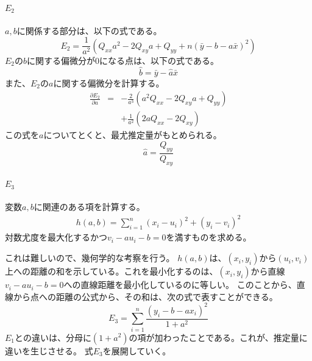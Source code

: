 \paragraph{$E_2$}
$a,b$に関係する部分は、以下の式である。
\begin{equation*}
 E_2 = \frac{1}{a^2}(Q_{xx}a^2-2Q_{xy}a+Q_{yy}+n(\bar{y}-b-a\bar{x})^2)
\end{equation*}
$E_2$の$b$に関する偏微分が$0$になる点は、以下の式である。
\begin{equation*}
 \hat{b} = \bar{y}-\hat{a}\bar{x}
\end{equation*}
また、$E_2$の$a$に関する偏微分を計算する。
\begin{eqnarray*}
 \frac{\partial E_2}{\partial a} &=& -\frac{2}{a^3}(a^2Q_{xx}-2Q_{xy}a+Q_{yy}) \\
& & +\frac{1}{a^2}(2aQ_{xx}-2Q_{xy})
\end{eqnarray*}
この式を$a$についてとくと、最尤推定量がもとめられる。
\begin{equation*}
 \hat{a}= \frac{Q_{yy}}{Q_{xy}}
\end{equation*}

\paragraph{$E_3$}

変数$a,b$に関連のある項を計算する。
\begin{eqnarray*}
 h(a,b) = \sum_{i=1}^n (x_i-u_i)^2+(y_i-v_i)^2
\end{eqnarray*}
対数尤度を最大化するかつ$v_i -a u_i -b = 0$を満すものを求める。

これは難しいので、幾何学的な考察を行う。
$h(a,b)$は、$(x_i,y_i)$から$(u_i,v_i)$上への距離の和を示している。これを最小化するのは、$(x_i,y_i)$から直線$v_i-a u_i-b=0$への直線距離を最小化しているのに等しい。
このことから、直線から点への距離の公式から、その和は、次の式で表すことができる。
\begin{equation*}
 E_3 = \sum_{i=1}^n \frac{ (y_i-b-ax_i)^2}{1+a^2}
\end{equation*}
$E_1$との違いは、分母に$(1+a^2)$の項が加わったことである。これが、推定量に違いを生じさせる。
式$E_3$を展開していく。

